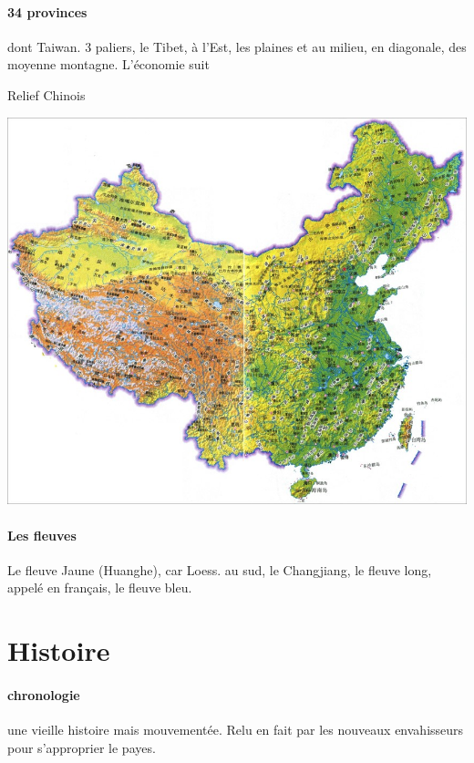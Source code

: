 \paragraph{34 provinces} dont Taiwan. 3 paliers, le Tibet, à l'Est, les plaines et au milieu, en diagonale, des moyenne montagne. L'économie suit
\begin{marginfigure} 
    \centering
        \caption{Relief Chinois}
\includegraphics[width=\textwidth]{ConfucianismeTaoismeBouddhismeChinois/Images/CarteChineRelief.jpg}

    \label{fig:enter-label}
\end{marginfigure}

 

\paragraph{Les fleuves} Le fleuve Jaune (Huanghe), car Loess. au sud, le Changjiang, le fleuve long, appelé en français, le fleuve bleu.


\section{Histoire}
\paragraph{chronologie} une vieille histoire mais mouvementée. Relu en fait par les nouveaux envahisseurs pour s'approprier le payes. 

